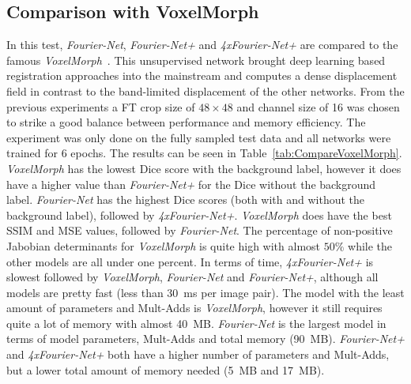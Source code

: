 \subsection{Comparison with VoxelMorph} \label{SubSec:ResultsComparisonVoxelMorph}
In this test, \emph{Fourier-Net}, \emph{Fourier-Net+} and \emph{4xFourier-Net+} are compared to the famous \emph{VoxelMorph}~\cite{Voxelmorph}. This unsupervised network brought deep learning based registration approaches into the mainstream and computes a dense displacement field in contrast to the band-limited displacement of the other networks. From the previous experiments a FT crop size of $48 \times 48$ and channel size of 16 was chosen to strike a good balance between performance and memory efficiency. The experiment was only done on the fully sampled test data and all networks were trained for 6 epochs. The results can be seen in Table~\ref{tab:CompareVoxelMorph}.\\
\emph{VoxelMorph} has the lowest Dice score with the background label, however it does have a higher value than \emph{Fourier-Net+} for the Dice without the background label. \emph{Fourier-Net} has the highest Dice scores (both with and without the background label), followed by \emph{4xFourier-Net+}. \emph{VoxelMorph} does have the best SSIM and MSE values, followed by \emph{Fourier-Net}. The percentage of non-positive Jabobian determinants for \emph{VoxelMorph} is quite high with almost $50\%$ while the other models are all under one percent. In terms of time, \emph{4xFourier-Net+} is slowest followed by \emph{VoxelMorph}, \emph{Fourier-Net} and \emph{Fourier-Net+}, although all models are pretty fast (less than 30~ms per image pair). The model with the least amount of parameters and Mult-Adds is \emph{VoxelMorph}, however it still requires quite a lot of memory with almost 40~MB. \emph{Fourier-Net} is the largest model in terms of model parameters, Mult-Adds and total memory (90~MB). \emph{Fourier-Net+} and \emph{4xFourier-Net+} both have a higher number of parameters and Mult-Adds, but a lower total amount of memory needed (5~MB and 17~MB). 

